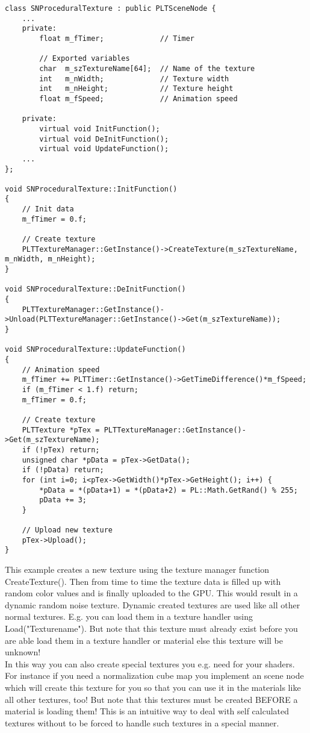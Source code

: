 \begin{lstlisting}[caption=Procedural texture class]
class SNProceduralTexture : public PLTSceneNode {
    ...
    private:
        float m_fTimer;             // Timer
        
        // Exported variables
        char  m_szTextureName[64];  // Name of the texture
        int   m_nWidth;             // Texture width
        int   m_nHeight;            // Texture height
        float m_fSpeed;             // Animation speed

    private:
        virtual void InitFunction();
        virtual void DeInitFunction();
        virtual void UpdateFunction();
	...
};

void SNProceduralTexture::InitFunction()
{
    // Init data
    m_fTimer = 0.f;
    
    // Create texture
    PLTTextureManager::GetInstance()->CreateTexture(m_szTextureName, m_nWidth, m_nHeight);
}

void SNProceduralTexture::DeInitFunction()
{
    PLTTextureManager::GetInstance()->Unload(PLTTextureManager::GetInstance()->Get(m_szTextureName));
}

void SNProceduralTexture::UpdateFunction()
{
    // Animation speed
    m_fTimer += PLTTimer::GetInstance()->GetTimeDifference()*m_fSpeed;
    if (m_fTimer < 1.f) return;
    m_fTimer = 0.f;

    // Create texture
    PLTTexture *pTex = PLTTextureManager::GetInstance()->Get(m_szTextureName);
    if (!pTex) return;
    unsigned char *pData = pTex->GetData();
    if (!pData) return;
    for (int i=0; i<pTex->GetWidth()*pTex->GetHeight(); i++) {
        *pData = *(pData+1) = *(pData+2) = PL::Math.GetRand() % 255;
        pData += 3;
    }

    // Upload new texture
    pTex->Upload();
}
\end{lstlisting}

This example creates a new texture using the texture manager function CreateTexture(). Then from
time to time the texture data is filled up with random color values and is finally uploaded to the GPU.
This would result in a dynamic random noise texture. Dynamic created textures are used like all other normal
textures. E.g. you can load them in a texture handler using Load("Texturename"). But note that
this texture must already exist before you are able load them in a texture handler or material else
this texture will be unknown!\\
In this way you can also create special textures you e.g. need for your shaders. For instance
if you need a normalization cube map you implement an scene node which will create this texture for you
so that you can use it in the materials like all other textures, too! But note that this textures
must be created BEFORE a material is loading them! This is an intuitive way to deal with self calculated
textures without to be forced to handle such textures in a special manner.



